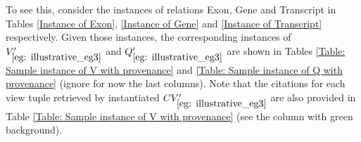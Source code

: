\begin{example}

To see this, consider the instances of relations Exon, Gene and Transcript in Tables \ref{Instance of Exon}, \ref{Instance of Gene} and \ref{Instance of Transcript} respectively.
Given those instances, the corresponding instances of $V_{\ref{eg: illustrative_eg3}}'$ and $Q_{\ref{eg: illustrative_eg3}}'$ are shown in Tables \ref{Table: Sample instance of V with provenance} and \ref{Table: Sample instance of Q with provenance} (ignore for now the last columns). Note that the citations for each view tuple retrieved by instantiated $CV_{\ref{eg: illustrative_eg3}}'$ are also provided in Table \ref{Table: Sample instance of V with provenance} (see the column with green background).




\end{example}
